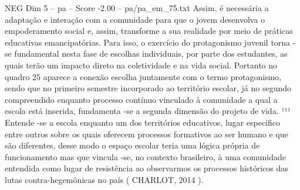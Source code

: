 \begin{textsample}{NEG Dim 5 – pa – Score -2.00 – pa/pa\_em\_75.txt}
Assim, é necessária a adaptação e interação com a comunidade para que o jovem desenvolva o empoderamento social e, assim, transforme a sua realidade por meio de práticas educativas emancipatórias.
Para isso, o exercício do protagonismo juvenil torna -se fundamental nesta fase de escolhas individuais, por parte dos estudantes, as quais terão um impacto direto na coletividade e na vida social.
Portanto no quadro 25 aparece a conexão escolha juntamente com o termo protagonismo, sendo que no primeiro semestre incorporado ao território escolar, já no segundo compreendido enquanto processo contínuo vinculado à comunidade a qual a escola está inserida, fundamenta -se a segunda dimensão do projeto de vida. ¹¹¹ Entende -se a escola enquanto um dos territórios educativos, lugar específico entre outros sobre os quais oferecem processos formativos ao ser humano e que são diferentes, desse modo o espaço escolar teria uma lógica própria de funcionamento mas que vincula -se, no contexto brasileiro, à uma comunidade entendida como lugar de resistência ao observarmos os processos históricos das lutas contra-hegemônicas no país ( CHARLOT, 2014 ).

\end{textsample}

